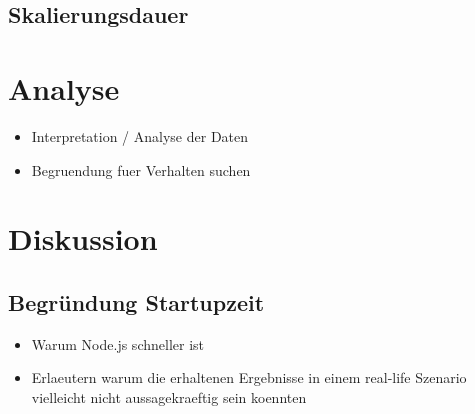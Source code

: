 


\subsection{Skalierungsdauer}




\section{Analyse}
\begin{itemize}
  \item Interpretation / Analyse der Daten
  \item Begruendung fuer Verhalten suchen
\end{itemize}

\section{Diskussion}

\subsection{Begr\"undung Startupzeit}
\begin{itemize}
  \item Warum Node.js schneller ist
\end{itemize}

\begin{itemize}
  \item Erlaeutern warum die erhaltenen Ergebnisse in einem real-life Szenario vielleicht nicht aussagekraeftig sein koennten
\end{itemize}
